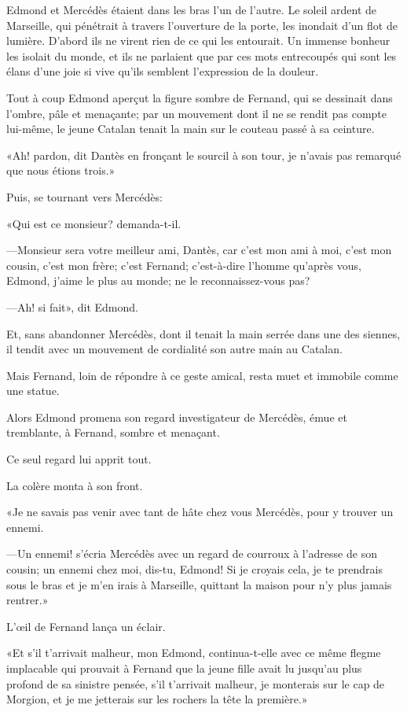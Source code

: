Edmond et Mercédès étaient dans les bras l'un de l'autre. Le soleil ardent de Marseille, qui pénétrait à travers l'ouverture de la porte, les inondait d'un flot de lumière. D'abord ils ne virent rien de ce qui les entourait. Un immense bonheur les isolait du monde, et ils ne parlaient que par ces mots entrecoupés qui sont les élans d'une joie si vive qu'ils semblent l'expression de la douleur.

Tout à coup Edmond aperçut la figure sombre de Fernand, qui se dessinait dans l'ombre, pâle et menaçante; par un mouvement dont il ne se rendit pas compte lui-même, le jeune Catalan tenait la main sur le couteau passé à sa ceinture.

«Ah! pardon, dit Dantès en fronçant le sourcil à son tour, je n'avais pas remarqué que nous étions trois.»

Puis, se tournant vers Mercédès:

«Qui est ce monsieur? demanda-t-il.

—Monsieur sera votre meilleur ami, Dantès, car c'est mon ami à moi, c'est mon cousin, c'est mon frère; c'est Fernand; c'est-à-dire l'homme qu'après vous, Edmond, j'aime le plus au monde; ne le reconnaissez-vous pas?

—Ah! si fait», dit Edmond.

Et, sans abandonner Mercédès, dont il tenait la main serrée dans une des siennes, il tendit avec un mouvement de cordialité son autre main au Catalan.

Mais Fernand, loin de répondre à ce geste amical, resta muet et immobile comme une statue.

Alors Edmond promena son regard investigateur de Mercédès, émue et tremblante, à Fernand, sombre et menaçant.

Ce seul regard lui apprit tout.

La colère monta à son front.

«Je ne savais pas venir avec tant de hâte chez vous Mercédès, pour y trouver un ennemi.

—Un ennemi! s'écria Mercédès avec un regard de courroux à l'adresse de son cousin; un ennemi chez moi, dis-tu, Edmond! Si je croyais cela, je te prendrais sous le bras et je m'en irais à Marseille, quittant la maison pour n'y plus jamais rentrer.»

L'œil de Fernand lança un éclair.

«Et s'il t'arrivait malheur, mon Edmond, continua-t-elle avec ce même flegme implacable qui prouvait à Fernand que la jeune fille avait lu jusqu'au plus profond de sa sinistre pensée, s'il t'arrivait malheur, je monterais sur le cap de Morgion, et je me jetterais sur les rochers la tête la première.»


